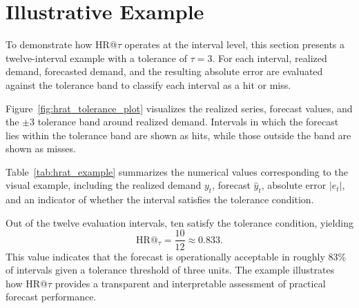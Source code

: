 \section{Illustrative Example}

To demonstrate how HR@\(\tau\) operates at the interval level, this section
presents a twelve-interval example with a tolerance of \(\tau = 3\). For each
interval, realized demand, forecasted demand, and the resulting absolute error are
evaluated against the tolerance band to classify each interval as a hit or miss.

Figure~\ref{fig:hrat_tolerance_plot} visualizes the realized series, forecast
values, and the \(\pm 3\) tolerance band around realized demand. Intervals in
which the forecast lies within the tolerance band are shown as hits, while those
outside the band are shown as misses.



Table~\ref{tab:hrat_example} summarizes the numerical values corresponding to the
visual example, including the realized demand \(y_t\), forecast \(\hat{y}_t\),
absolute error \(|e_t|\), and an indicator of whether the interval satisfies the
tolerance condition.



Out of the twelve evaluation intervals, ten satisfy the tolerance condition,
yielding
\[
\mathrm{HR@}_\tau = \frac{10}{12} \approx 0.833.
\]
This value indicates that the forecast is operationally acceptable in roughly
83\% of intervals given a tolerance threshold of three units. The example
illustrates how HR@\(\tau\) provides a transparent and interpretable assessment of
practical forecast performance.
